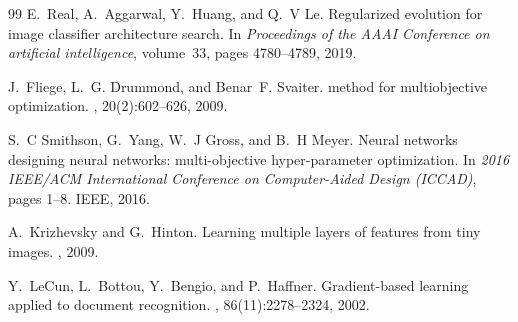 \documentclass[smallextended,referee,envcountsect]{svjour3}
\begin{document}
\begin{thebibliography}{99}
E.~Real, A.~Aggarwal, Y.~Huang, and Q.~V Le.
\newblock Regularized evolution for image classifier architecture search.
\newblock In {\em Proceedings of the AAAI Conference on artificial intelligence}, volume~33, pages 4780--4789, 2019.

J.~Fliege, L.~G. Drummond, and Benar~F. Svaiter.
 method for multiobjective optimization.
, 20(2):602--626, 2009.

S.~C Smithson, G.~Yang, W.~J Gross, and B.~H Meyer.
\newblock Neural networks designing neural networks: multi-objective hyper-parameter optimization.
\newblock In {\em 2016 IEEE/ACM International Conference on Computer-Aided Design (ICCAD)}, pages 1--8. IEEE, 2016.

A.~Krizhevsky and G.~Hinton.
\newblock Learning multiple layers of features from tiny images.
, 2009.

Y.~LeCun, L.~Bottou, Y.~Bengio, and P.~Haffner.
\newblock Gradient-based learning applied to document recognition.
, 86(11):2278--2324, 2002.

\end{thebibliography}
\end{document}
